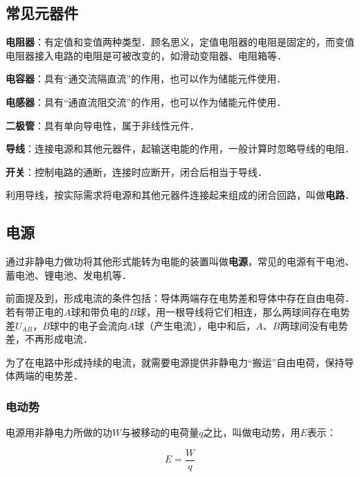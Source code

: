 
\begin{issues}
\issueDraft
\issueTODO
\end{issues}


\subsection{常见元器件}

\textbf{电阻器}：有定值和变值两种类型．顾名思义，定值电阻器的电阻是固定的，而变值电阻器接入电路的电阻是可被改变的，如滑动变阻器、电阻箱等．

\textbf{电容器}：具有“通交流隔直流”的作用，也可以作为储能元件使用．

\textbf{电感器}：具有“通直流阻交流”的作用，也可以作为储能元件使用．

\textbf{二极管}：具有单向导电性，属于非线性元件．

\textbf{导线}：连接电源和其他元器件，起输送电能的作用，一般计算时忽略导线的电阻．

\textbf{开关}：控制电路的通断，连接时应断开，闭合后相当于导线．

利用导线，按实际需求将电源和其他元器件连接起来组成的闭合回路，叫做\textbf{电路}．

\subsection{电源}

通过非静电力做功将其他形式能转为电能的装置叫做\textbf{电源}，常见的电源有干电池、蓄电池、锂电池、发电机等．

前面提及到，形成电流的条件包括：导体两端存在电势差和导体中存在自由电荷．若有带正电的$A$球和带负电的$B$球，用一根导线将它们相连，那么两球间存在电势差$U_{AB}$，$B$球中的电子会流向$A$球（产生电流），电中和后，$A$、$B$两球间没有电势差，不再形成电流．

为了在电路中形成持续的电流，就需要电源提供非静电力“搬运”自由电荷，保持导体两端的电势差．

\subsubsection{电动势}

电源用非静电力所做的功$W$与被移动的电荷量$q$之比，叫做电动势，用$E$表示：

\begin{equation}
E=\frac{W}{q}
\end{equation}

